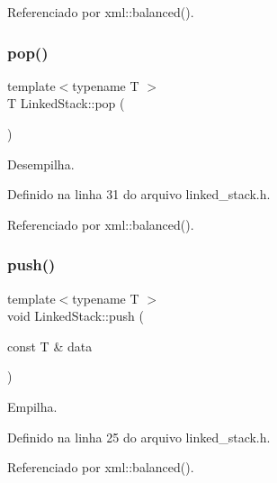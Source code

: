Referenciado por xml\+::balanced().

\mbox{\label{classstructures_1_1_linked_stack_af831820610fd8e0a145757813a9afb4b}} 
\subsubsection{\texorpdfstring{pop()}{pop()}}
{\footnotesize\ttfamily template$<$typename T $>$ \\
T Linked\+Stack\+::pop (\begin{DoxyParamCaption}{ }\end{DoxyParamCaption})}



Desempilha. 



Definido na linha 31 do arquivo linked\+\_\+stack.\+h.



Referenciado por xml\+::balanced().

\mbox{\label{classstructures_1_1_linked_stack_a1af82de27376dbfb49c2872fef6cbcab}} 
\subsubsection{\texorpdfstring{push()}{push()}}
{\footnotesize\ttfamily template$<$typename T $>$ \\
void Linked\+Stack\+::push (\begin{DoxyParamCaption}\item[{const T \&}]{data }\end{DoxyParamCaption})}



Empilha. 



Definido na linha 25 do arquivo linked\+\_\+stack.\+h.



Referenciado por xml\+::balanced().

\mbox{\label{classstructures_1_1_linked_stack_a0c7926b74ce17436c28fa18efd3f15a2}} 
